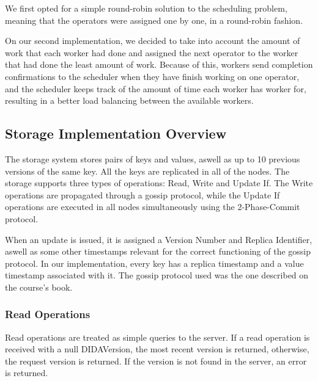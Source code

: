 \documentclass[times, 10pt,twocolumn]{article}
\begin{document}
We first opted for a simple round-robin solution to the scheduling problem, meaning that the operators were assigned one by one, in a round-robin fashion.

On our second implementation, we decided to take into account the amount of work that each worker had done and assigned the next operator to the worker that
had done the least amount of work. Because of this, workers send completion confirmations to the scheduler when they have finish working on one operator, and the scheduler 
keeps track of the amount of time each worker has worker for, resulting in a better load balancing between the available workers.


\subsection{Storage Implementation Overview}
The storage system stores pairs of keys and values, aswell as up to 10 previous versions of the same key. All the keys are
replicated in all of the nodes. The storage supports three types of operations: Read, Write and Update If. The Write operations are
propagated through a gossip protocol, while the Update If operations are executed in all nodes simultaneously using the 2-Phase-Commit
protocol.

When an update is issued, it is assigned a Version Number and Replica Identifier, aswell as some other timestamps relevant for the correct 
functioning of the gossip protocol. In our implementation, every key has a replica timestamp and a value timestamp associated with it. 
The gossip protocol used was the one described on the course's book.

\subsubsection{Read Operations}

Read operations are treated as simple queries to the server. If a read operation is received with a null DIDAVersion, the most recent version is returned,
otherwise, the request version is returned. If the version is not found in the server, an error is returned.
\end{document}
